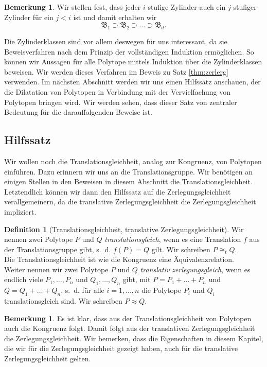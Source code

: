 \documentclass[11pt,titlepage]{article}
\theoremstyle{definition}
\newtheorem{definition}[theorem]{Definition}
\newtheorem{remark}[theorem]{Bemerkung}
\theoremstyle{remark}
\begin{document}
	\begin{remark}
		Wir stellen fest, dass jeder $i$-stufige Zylinder auch ein $j$-stufiger 
		Zylinder für ein $j<i$ ist und damit erhalten wir
		\[\mathfrak{B}_1\supset \mathfrak{B}_2\supset \ldots\supset\mathfrak{B}_d.\]
	\end{remark}
	
	Die Zylinderklassen sind vor allem deswegen für uns interessant, da sie 
	Beweisverfahren nach dem Prinzip der vollständigen Induktion ermöglichen. 
	So können wir Aussagen für alle Polytope mittels Induktion über die 
	Zylinderklassen beweisen. Wir werden dieses Verfahren im Beweis zu Satz 
	\ref{thm:zerlerg} verwenden. Im nächsten Abschnitt werden wir uns 
	einen Hilfssatz anschauen, der die Dilatation von Polytopen 
	in Verbindung mit der Vervielfachung von Polytopen bringen wird. 
	Wir werden sehen, dass dieser Satz von zentraler Bedeutung für 
	die darauffolgenden Beweise ist.
	
	\subsection{Hilfssatz}
	
	Wir wollen noch die Translationsgleichheit, analog zur Kongruenz, 
	von Polytopen einführen. 
	Dazu erinnern wir uns an die Translationsgruppe.  
	Wir benötigen an einigen Stellen in den Beweisen in diesem Abschnitt 
	die Translationsgleichheit. Letztendlich können wir dann den Hilfssatz 
	auf die Zerlegungsgleichheit verallgemeinern, da die translative 
	Zerlegungsgleichheit die Zerlegungsgleichheit impliziert.
	
	\begin{definition}[Translationsgleichheit, translative Zerlegungsgleichheit]
		Wir nennen zwei Polytope $P$ und $Q$ \textsl{translationsgleich}, wenn es 
		eine Translation $f$ aus der Translationsgruppe gibt, s.~d. 
		$f(P)=Q$ gilt. Wir schreiben $P\cong_t Q$. \\
		Die Translationsgleichheit ist wie die Kongruenz eine 
		Äquivalenzrelation. \\
		Weiter nennen wir zwei Polytope $P$ und $Q$ \textsl{translativ 
		zerlegungsgleich}, wenn es endlich viele $P_1,\ldots,P_n$ und 
		$Q_1,\ldots,Q_n$ gibt, mit $P=P_1+\ldots+P_n$ und $Q=Q_1+\ldots+Q_n$, s.~d. 
		für alle $i=1,\ldots,n$ die Polytope $P_i$ und $Q_i$ translationsgleich 
		sind. Wir schreiben $P\approx Q$.
	\end{definition}
	
	\begin{remark}
		Es ist klar, dass aus der Translationsgleichheit von Polytopen auch die 
		Kongruenz folgt. Damit folgt aus der translativen Zerlegungsgleichheit 
		die Zerlegungsgleichheit. Wir bemerken, dass die Eigenschaften 
		in diesem Kapitel, 
		die wir für die Zerlegungsgleichheit gezeigt haben, 
		auch für die translative Zerlegungsgleichheit gelten. 
	\end{remark}
	
\end{document}
